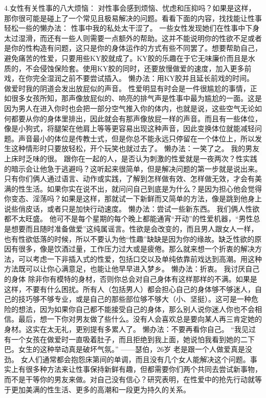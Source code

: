 \documentclass[12pt,UTF8,openany]{ctexbook}
\begin{document}
4.女性有关性事的八大烦恼：
对性事会感到烦恼、忧虑和压抑吗？如果是这样，那你很可能是碰上了一个常见且极易解决的问题。看看下面的内容，找找能让性事轻松一些的懒办法：
性事中我的私处太干涩了。
一些女性发现她们在性事中下身太过湿滑，而还有一些人则需要一点额外的帮助。这并不能说明你的性欲不足或者是你的性构造有问题，这只是你的身体运作的方式有些不同罢了。想要帮助自己，避免痛苦的性爱，只要用些KY胶就成了。KY胶的乐趣在于它无味廉价而且是水质的，不会侵蚀保险套。使用KY胶的同时，还要放慢做爱的速度，加入更多前戏，在你完全湿润之前不要尝试插入。
懒办法：用KY胶并且延长前戏的时间。
做爱时我的阴道会发出放屁似的声音。
性爱明显有时会是一件很尴尬的事情，正如很多女孩所知，那声像放屁似的、响亮的排气声是性事中最为尴尬的一面。这是因为男人在进入你时也会把一部分空气推入你的体内，也就是说，这些空气无论如何都要从你的身体里排出，因此就会有那声像放屁一样的声音。而且有一些体位，像是小狗式，将腿架在他肩上等等更容易出现这种声音，因此变换体位就能减轻问题。声音最小的体位是传教士式，但是你总不能永远只停留在一个体位上，所以发生这种情形时只要放轻松，开个玩笑也就过去了。
懒办法：一笑了之。
我的男友上床时乏味的很。
跟你在一起的人，是否认为刺激的性爱就是一夜两次？性实践的暗示会让他急于逃避吗？这听起来很简单，但是解决问题的第一步就是说出来。只有你们俩人通过语言、动作或实践，了解到怎样做有效、怎样做无效，才会有美满的性生活。如果你实在说不出，就问问自己到底是为什么？是因为担心他会觉得你变态、淫荡吗？如果是这样，那就试一下新鲜而又简单的方法，像是跳到他身上说些俏皮话，或者只是加快行动速度。
懒办法：尝试一些新东西。
我们俩人性欲都不太旺盛。
他可不是每个星期的每个晚上都能通宵“开动”的性爱机器，“男性总是想要而且随时准备做爱”这纯属谣言。性欲是会改变的，而且男人跟女人一样，也有性欲低落的时候，所以不要认为他“性趣”缺缺是因为你的缘故。缺乏性欲的原因有很多，像是饮酒过量，工作压力过大或是疲倦。那么就来想一个折衷的解决方法，可以考虑一下非插入式的性爱，包括口交以及单纯依靠前戏达到高潮。用这种方法既可以让你心满意足，也能让他早早进入梦乡。
懒办法：折衷。
我讨厌自己的身体
除非你有模特的身材，否则你总会对自己身体有这样那样的不满。如果是这样，不要有什么困扰。所有人（包括男人）都会担心自己的身体够不够迷人，自己的技巧够不够专业，或是自己的那些部位够不够大（小、坚挺）。这可是一种危险的想法，因为如果你自己都不能接受自己的身体，那么别人说你迷人你也不会相信。最后，想一下你对男友做了些什么。没有人会喜欢总是要向某人再三肯定她的身材。这实在太无礼，更别提有多累人了。
懒办法：不要再看你自己。
“我见过有一个女孩在做爱时一直吸着肚子，而且拒绝到我上面，她说怕我看到她的二下巴。女生的这种举动真是破坏气氛。”
——瑟伯，26岁
老是跟一个人做爱真是没劲。
女人们通常都会抱怨床第间的单调，而且没有几个女人能解决这个问题。事实上有很多种方法来让性事保持新鲜有趣，但都需要你们两个共同去尝试新事物，而不是干等你的男友来做。对自己没有信心？研究表明，在性爱中的抢先行动就等于更加美满的性生活、更多的高潮和一段更为持久的关系。
\end{document}
